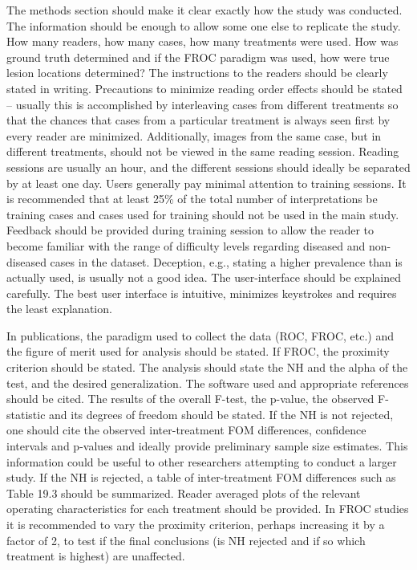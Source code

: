 \documentclass[
]{book}
\begin{document}
The methods section should make it clear exactly how the study was conducted. The information should be enough to allow some one else to replicate the study. How many readers, how many cases, how many treatments were used. How was ground truth determined and if the FROC paradigm was used, how were true lesion locations determined? The instructions to the readers should be clearly stated in writing. Precautions to minimize reading order effects should be stated -- usually this is accomplished by interleaving cases from different treatments so that the chances that cases from a particular treatment is always seen first by every reader are minimized. Additionally, images from the same case, but in different treatments, should not be viewed in the same reading session. Reading sessions are usually an hour, and the different sessions should ideally be separated by at least one day. Users generally pay minimal attention to training sessions. It is recommended that at least 25\% of the total number of interpretations be training cases and cases used for training should not be used in the main study. Feedback should be provided during training session to allow the reader to become familiar with the range of difficulty levels regarding diseased and non-diseased cases in the dataset. Deception, e.g., stating a higher prevalence than is actually used, is usually not a good idea. The user-interface should be explained carefully. The best user interface is intuitive, minimizes keystrokes and requires the least explanation.

In publications, the paradigm used to collect the data (ROC, FROC, etc.) and the figure of merit used for analysis should be stated. If FROC, the proximity criterion should be stated. The analysis should state the NH and the alpha of the test, and the desired generalization. The software used and appropriate references should be cited. The results of the overall F-test, the p-value, the observed F-statistic and its degrees of freedom should be stated. If the NH is not rejected, one should cite the observed inter-treatment FOM differences, confidence intervals and p-values and ideally provide preliminary sample size estimates. This information could be useful to other researchers attempting to conduct a larger study. If the NH is rejected, a table of inter-treatment FOM differences such as Table 19.3 should be summarized. Reader averaged plots of the relevant operating characteristics for each treatment should be provided. In FROC studies it is recommended to vary the proximity criterion, perhaps increasing it by a factor of 2, to test if the final conclusions (is NH rejected and if so which treatment is highest) are unaffected.
\end{document}
